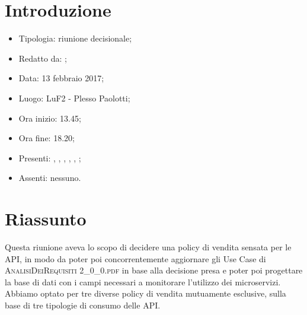 \section{Introduzione}

	\begin{itemize}
		\item Tipologia: riunione decisionale;
		\item Redatto da: \DS;
		\item Data: 13 febbraio 2017;
		\item Luogo: LuF2 - Plesso Paolotti;
		\item Ora inizio: 13.45;
		\item Ora fine: 18.20;
		\item Presenti: \AN, \DAN, \DS, \AS, \NS, \MC;
		\item Assenti: nessuno.		
	\end{itemize}

\section{Riassunto}
Questa riunione aveva lo scopo di decidere una policy di vendita sensata per le API, in modo da poter poi concorrentemente aggiornare gli Use Case di \textsc{AnalisiDeiRequisiti 2\_0\_0.pdf} in base alla decisione presa e poter poi progettare la base di dati con i campi necessari a monitorare l'utilizzo dei microservizi. Abbiamo optato per tre diverse policy di vendita mutuamente esclusive, sulla base di tre tipologie di consumo delle API.


